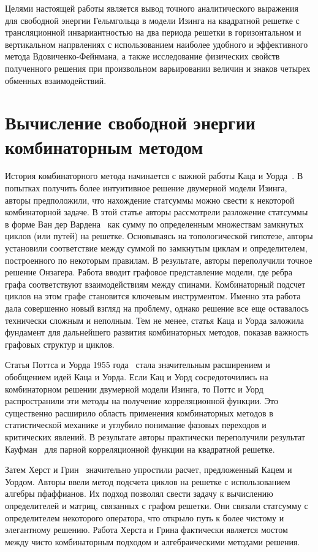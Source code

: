 \documentclass[utf8,12pt]{jetp}
\begin{document}
Целями настоящей работы является вывод точного аналитического выражения для свободной энергии Гельмгольца в модели Изинга на квадратной решетке с трансляционной инвариантностью на два периода решетки в горизонтальном и вертикальном напрвлениях с использованием наиболее удобного и эффективного метода Вдовиченко-Фейнмана, а также исследование физических свойств полученного решения при произвольном варьировании величин и знаков четырех обменных взаимодействий.

\section{Вычисление свободной энергии комбинаторным методом}

История комбинаторного метода начинается с важной работы Каца и Уорда~\cite{kac1952}. В попытках получить более интуитивное решение двумерной модели Изинга, авторы предположили, что нахождение статсуммы можно свести к некоторой комбинаторной задаче. В этой статье авторы рассмотрели разложение статсуммы в форме Ван дер Вардена~\cite{warden1941} как сумму по определенным множествам замкнутых циклов (или путей) на решетке. Основываясь на топологической гипотезе, авторы установили соответствие между суммой по замкнутым циклам и определителем, построенного по некоторым правилам. В результате, авторы переполучили точное решение Онзагера. Работа вводит графовое представление модели, где ребра графа соответствуют взаимодействиям между спинами. Комбинаторный подсчет циклов на этом графе становится ключевым инструментом. Именно эта работа дала совершенно новый взгляд на проблему, однако решение все еще оставалось технически сложным и неполным. Тем не менее, статья Каца и Уорда заложила фундамент для дальнейшего развития комбинаторных методов, показав важность графовых структур и циклов. 

Статья Поттса и Уорда 1955 года~\cite{potts1955} стала значительным расширением и обобщением идей Каца и Уорда. Если Кац и Уорд сосредоточились на комбинаторном решении двумерной модели Изинга, то Поттс и Уорд распространили эти методы на получение корреляционной функции. Это существенно расширило область применения комбинаторных методов в статистической механике и углубило понимание фазовых переходов и критических явлений. В результате авторы практически переполучили результат Кауфман~\cite{kaufman1949} для парной корреляционной функции на квадратной решетке.

Затем Херст и Грин~\cite{hurst1960} значительно упростили расчет, предложенный Кацем и Уордом. Авторы ввели метод подсчета циклов на решетке с использованием алгебры пфаффианов. Их подход позволял свести задачу к вычислению определителей и матриц, связанных с графом решетки. Они связали статсумму с определителем некоторого оператора, что открыло путь к более чистому и элегантному решению. Работа Херста и Грина фактически является мостом между чисто комбинаторным подходом и алгебраическими методами решения.
 
\end{document}
